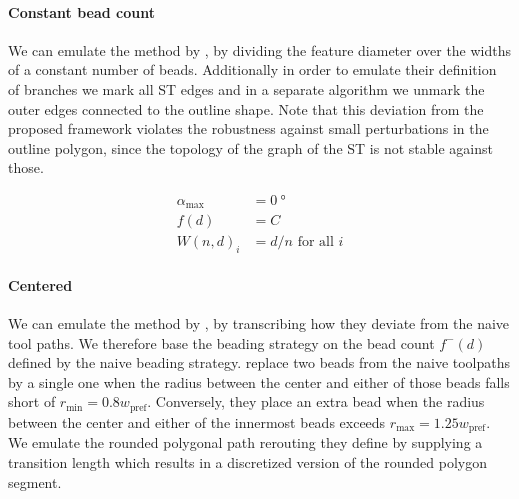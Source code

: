 \paragraph{Constant bead count}
We can emulate the method by \citeauthor{Ding2016a}, by dividing the feature diameter over the widths of a constant number of beads.
Additionally in order to emulate their definition of branches we mark all ST edges and in a separate algorithm we unmark the outer edges connected to the outline shape.
Note that this deviation from the proposed framework violates the robustness against small perturbations in the outline polygon, since the topology of the graph of the ST is not stable against those.

\begin{align*}
\alpha_\text{max} &= \SI{0}{\degree} \\
f(d) &= C \\
W(n,d)_i &= d / n \text{ for all } i 
\end{align*}



\paragraph{Centered}
We can emulate the method by \citeauthor{Jin2017JMS}, by transcribing how they deviate from the naive tool paths.
We therefore base the beading strategy on the bead count $f^-(d)$ defined by the naive beading strategy.
\citeauthor{Jin2017JMS} replace two beads from the naive toolpaths by a single one when the radius between the center and either of those beads falls short of $r_\text{min} = 0.8 w_\text{pref}$.
Conversely, they place an extra bead when the radius between the center and either of the innermost beads exceeds $r_\text{max} = 1.25 w_\text{pref}$.\cite{Jin2017JMS}
We emulate the rounded polygonal path rerouting they define by supplying a transition length which results in a discretized version of the rounded polygon segment.


